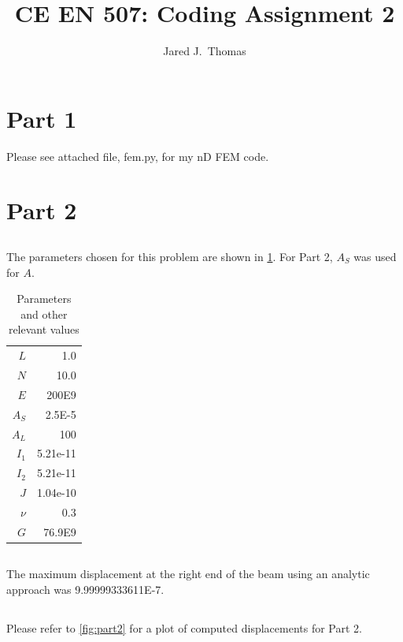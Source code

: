 \documentclass{article}
\title{CE EN 507: Coding Assignment 2}
\author{ Jared J.~Thomas}
\begin{document}
\maketitle

\section{Part 1}
Please see attached file, fem.py, for my nD FEM code.

\section{Part 2}
\subsection{}
The parameters chosen for this problem are shown in \cref{tab:parameters}. For Part 2, $A_S$ was used for $A$.

\begin{table}
	\centering
	\begin{tabular}{| r | r |}
		\hline
		$L$ & 1.0 \\
		$N$ & 10.0 \\
		$E$ & 200E9 \\
		$A_{S}$ & 2.5E-5\\
		$A_{L}$ & 100 \\
		$I_1$ & 5.21e-11\\
		$I_2$ & 5.21e-11\\
		$J$ & 1.04e-10\\
		$\nu$ & 0.3 \\
		$G$ & 76.9E9 \\
		\hline
	\end{tabular}
	\caption{Parameters and other relevant values}
	\label{tab:parameters}
\end{table}

\subsection{}
The maximum displacement at the right end of the beam using an analytic approach was 9.99999333611E-7.

\subsection{}
Please refer to \cref{fig:part2} for a plot of computed displacements for Part 2.
\end{document}
